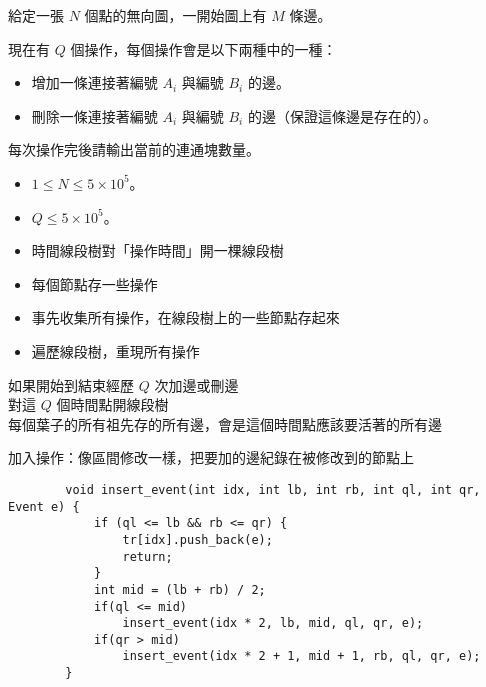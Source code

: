 \begin{frame}{\ebtitle}
    \begin{problem}
        給定一張 $N$ 個點的無向圖，一開始圖上有 $M$ 條邊。

        現在有 $Q$ 個操作，每個操作會是以下兩種中的一種：
        
        \begin{itemize}
            \item 增加一條連接著編號 $A_i$ 與編號 $B_i$ 的邊。
            \item 刪除一條連接著編號 $A_i$ 與編號 $B_i$ 的邊（保證這條邊是存在的）。
        \end{itemize}

        每次操作完後請輸出當前的連通塊數量。

        \begin{itemize}
            \item $1\le N\le 5\times 10^5$。
            \item $Q\le 5\times 10^5$。
        \end{itemize}
    \end{problem}
\end{frame}

\begin{frame}{\ebtitle}
    \begin{itemize}
        \item 時間線段樹對「操作時間」開一棵線段樹
        \item 每個節點存一些操作
        \item 事先收集所有操作，在線段樹上的一些節點存起來
        \item {} 遍歷線段樹，重現所有操作
    \end{itemize}
\end{frame}

\begin{frame}{\ebtitle}
    如果開始到結束經歷 $Q$ 次加邊或刪邊 \\
    對這 $Q$ 個時間點開線段樹 \\
    每個葉子的所有祖先存的所有邊，會是這個時間點應該要活著的所有邊
\end{frame}

\begin{frame}[fragile]{\ebtitle}
    加入操作：像區間修改一樣，把要加的邊紀錄在被修改到的節點上
    \begin{verbatim}
        void insert_event(int idx, int lb, int rb, int ql, int qr, Event e) {
            if (ql <= lb && rb <= qr) {
                tr[idx].push_back(e);
                return;
            }   
            int mid = (lb + rb) / 2;
            if(ql <= mid)
                insert_event(idx * 2, lb, mid, ql, qr, e);
            if(qr > mid)
                insert_event(idx * 2 + 1, mid + 1, rb, ql, qr, e);
        }
    \end{verbatim}
\end{frame}

